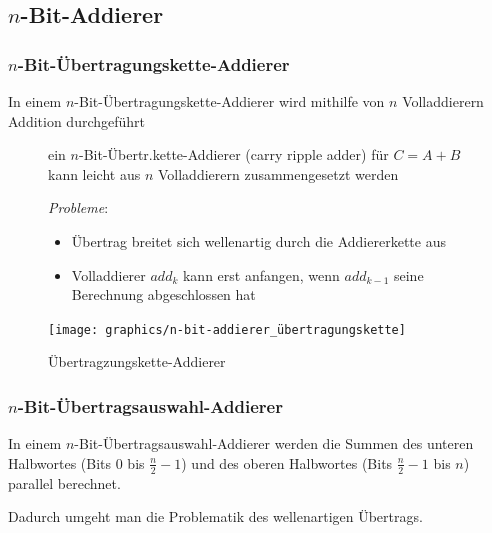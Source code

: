 \documentclass[12pt]{report}
\begin{document}
\subsection{$n$-Bit-Addierer}
\subsubsection{$n$-Bit-Übertragungskette-Addierer}
\begin{defbox}
  In einem $n$-Bit-Übertragungskette-Addierer wird mithilfe von $n$ Volladdierern Addition durchgeführt
\end{defbox}
\begin{figure}[H]
  \begin{minipage}[t]{.45\textwidth}
    ein $n$-Bit-Übertr.kette-Addierer (carry ripple adder) für $C = A + B$
    kann leicht aus $n$ Volladdierern zusammengesetzt werden\\
    \par \textit{Probleme}:
    \begin{itemize}
      \item Übertrag breitet sich wellenartig durch die Addiererkette aus
      \item Volladdierer $add_k$ kann erst anfangen, wenn $add_{k-1}$ seine Berechnung abgeschlossen hat
    \end{itemize}
  \end{minipage}
  \hfill
  \begin{minipage}[t]{.45\textwidth}
    \caption{Übertragzungskette-Addierer}
    \centering
    \vspace{0pt}
    \texttt{[image: graphics/n-bit-addierer\_übertragungskette]}
  \end{minipage}
\end{figure}

\subsubsection{$n$-Bit-Übertragsauswahl-Addierer}
\begin{defbox}
  In einem $n$-Bit-Übertragsauswahl-Addierer werden die Summen des unteren Halbwortes (Bits 0 bis $\frac{n}{2}-1$) und 
  des oberen Halbwortes (Bits $\frac{n}{2}-1$ bis $n$) parallel berechnet.
  
  Dadurch umgeht man die Problematik des wellenartigen Übertrags.
\end{defbox}
\end{document}
